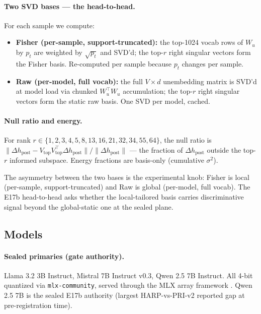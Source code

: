 \documentclass[10pt, letterpaper]{article}
\newcommand{\dhpost}{\Delta h_{\text{post}}}
\newcommand{\Wu}{W_u}
\begin{document}
\paragraph{Two SVD bases --- the head-to-head.}
For each sample we compute:

\begin{itemize}[leftmargin=*, itemsep=2pt, topsep=2pt]
  \item \textbf{Fisher (per-sample, support-truncated):} the top-1024
  vocab rows of $\Wu$ by $p_t$ are weighted by $\sqrt{p_t}$ and SVD'd;
  the top-$r$ right singular vectors form the Fisher basis.
  Re-computed per sample because $p_t$ changes per sample.

  \item \textbf{Raw (per-model, full vocab):} the full $V \times d$
  unembedding matrix is SVD'd at model load via chunked $\Wu^\top \Wu$
  accumulation; the top-$r$ right singular vectors form the static
  raw basis. One SVD per model, cached.
\end{itemize}

\paragraph{Null ratio and energy.}
For rank $r \in \{1, 2, 3, 4, 5, 8, 13, 16, 21, 32, 34, 55, 64\}$, the
null ratio is $\| \dhpost - V_{\text{top}} V_{\text{top}}^\top \dhpost
\| / \| \dhpost \|$ --- the fraction of $\dhpost$ outside the top-$r$
informed subspace. Energy fractions are basis-only (cumulative
$\sigma^2$).

The asymmetry between the two bases is the experimental knob: Fisher
is local (per-sample, support-truncated) and Raw is global (per-model,
full vocab). The E17b head-to-head asks whether the local-tailored
basis carries discriminative signal beyond the global-static one at
the sealed plane.

\subsection{Models}
\label{sec:methods:models}

\paragraph{Sealed primaries (gate authority).}
Llama 3.2 3B Instruct, Mistral 7B Instruct v0.3, Qwen 2.5 7B Instruct.
All 4-bit quantized via \texttt{mlx-community}, served through the
MLX array framework \citep{mlxframework}. Qwen 2.5 7B is the sealed
E17b authority (largest HARP-vs-PRI-v2 reported gap at
pre-registration time).
\end{document}
